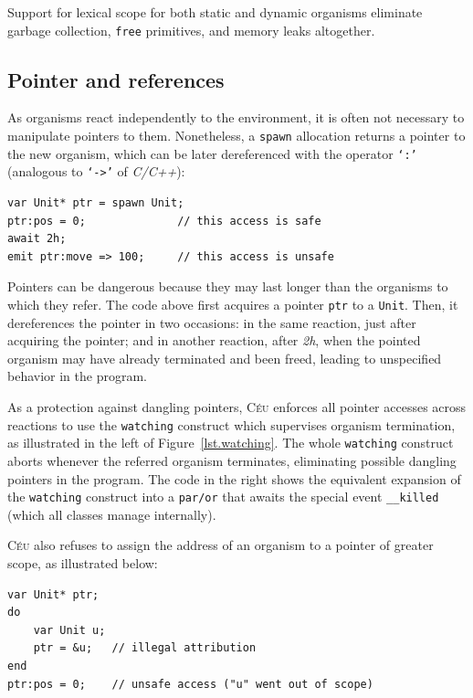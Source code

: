 \documentclass[preprint]{sigplanconf}
\newcommand{\CEU}{\textsc{C\'{e}u}\xspace}
\newcommand{\code}[1] {{\small{\texttt{#1}}}}
\newcommand{\1}{\;}
\newcommand{\2}{\;\;}
\newcommand{\3}{\;\;\;}
\newcommand{\5}{\;\;\;\;\;}
\begin{document}
Support for lexical scope for both static and dynamic organisms eliminate 
garbage collection, \code{free} primitives, and memory leaks altogether.


\subsection{Pointer and references}
\label{sec.orgs.refs}

As organisms react independently to the environment, it is often not necessary 
to manipulate pointers to them.
%
Nonetheless, a \code{spawn} allocation returns a pointer to the new organism, 
which can be later dereferenced with the operator \code{`:'} (analogous to 
\code{`->'} of \emph{C/C++}):

\begin{lstlisting}
var Unit* ptr = spawn Unit;
ptr:pos = 0;              // this access is safe
await 2h;
emit ptr:move => 100;     // this access is unsafe
\end{lstlisting}

Pointers can be dangerous because they may last longer than the organisms to 
which they refer.
%
The code above first acquires a pointer \code{ptr} to a \code{Unit}.
Then, it dereferences the pointer in two occasions:
in the same reaction, just after acquiring the pointer;
and in another reaction, after \emph{2h}, when the pointed organism may have 
already terminated and been freed, leading to unspecified behavior in the 
program.

As a protection against dangling pointers, \CEU enforces all pointer accesses 
across reactions to use the \code{watching} construct which supervises organism 
termination, as illustrated in the left of Figure~\ref{lst.watching}.
%
The whole \code{watching} construct aborts whenever the referred organism 
terminates, eliminating possible dangling pointers in the program.
%
The code in the right shows the equivalent expansion of the \code{watching} 
construct into a \code{par/or} that awaits the special event \code{\_\_killed} 
(which all classes manage internally).

\CEU also refuses to assign the address of an organism to a pointer of greater 
scope, as illustrated below:

\begin{lstlisting}
var Unit* ptr;
do
    var Unit u;
    ptr = &u;   // illegal attribution
end
ptr:pos = 0;    // unsafe access ("u" went out of scope)
\end{lstlisting}
\end{document}
